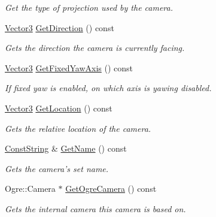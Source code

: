 \begin{DoxyCompactItemize}
\begin{DoxyCompactList}\small\item\em Get the type of projection used by the camera. \item\end{DoxyCompactList}\item 
\hyperlink{classMezzanine_1_1Vector3}{Vector3} \hyperlink{classMezzanine_1_1Camera_a1b23b180e30225bc6e1b90a2d270771e}{GetDirection} () const 
\begin{DoxyCompactList}\small\item\em Gets the direction the camera is currently facing. \item\end{DoxyCompactList}\item 
\hyperlink{classMezzanine_1_1Vector3}{Vector3} \hyperlink{classMezzanine_1_1Camera_af7a94974ef5ff6caff66da3a9f71b579}{GetFixedYawAxis} () const 
\begin{DoxyCompactList}\small\item\em If fixed yaw is enabled, on which axis is yawing disabled. \item\end{DoxyCompactList}\item 
\hyperlink{classMezzanine_1_1Vector3}{Vector3} \hyperlink{classMezzanine_1_1Camera_afb87a19855c4cd5361861e1e400d5481}{GetLocation} () const 
\begin{DoxyCompactList}\small\item\em Gets the relative location of the camera. \item\end{DoxyCompactList}\item 
\hyperlink{namespaceMezzanine_a63cd699ac54b73953f35ec9cfc05e506}{ConstString} \& \hyperlink{classMezzanine_1_1Camera_abf6e3c2e642753023acd91f6d1413455}{GetName} () const 
\begin{DoxyCompactList}\small\item\em Gets the camera's set name. \item\end{DoxyCompactList}\item 
Ogre::Camera $\ast$ \hyperlink{classMezzanine_1_1Camera_ac7985618c8f908a6cc93069ccb51bb47}{GetOgreCamera} () const 
\begin{DoxyCompactList}\small\item\em Gets the internal camera this camera is based on. \item\end{DoxyCompactList}\item 

\end{DoxyCompactItemize}
